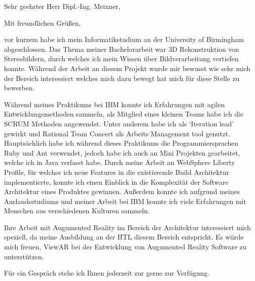 \documentclass[12pt, a4paper,ngerman,sans]{moderncv}        %
\newcommand{\plus}{\raisebox{.4\height}{\scalebox{.6}{+}}}
\begin{document}
\date{\myformat\today}
\subject{Bewerbung als Junior C\plus\plus\hspace{.25em}Entwickler}

\opening{Sehr geehrter Herr Dipl.-Ing. Meixner,}
\closing{Mit freundlichen Grüßen,}
\makelettertitle
vor kurzem habe ich mein Informatikstudium an der University of Birmingham abgeschlossen. Das Thema meiner Bachelorarbeit war 3D Rekonstruktion von Stereobildern, durch welches ich mein Wissen über Bildverarbeitung vertiefen konnte. Während der Arbeit an diesem Projekt wurde mir bewusst wie sehr mich der Bereich interessiert welches mich dazu bewegt hat mich für diese Stelle zu bewerben.

Während meines Praktikums bei IBM konnte ich Erfahrungen mit agilen Entwicklungsmethoden sammeln, als Mitglied eines kleinen Teams habe ich die SCRUM Methoden angewendet. Unter anderem habe ich als `Iteration lead' gewirkt und Rational Team Concert als Arbeits Management tool genutzt. Hauptsächlich habe ich während dieses Praktikums die Programmiersprachen Ruby und Ant verwendet, jedoch habe ich auch an Mini Projekten gearbeitet, welche ich in Java verfasst habe. Durch meine Arbeit an WebSphere Liberty Profile, für welches ich neue Features in die existierende Build Architektur implementierte, konnte ich einen Einblick in die Komplexität der Software Architektur eines Produktes gewinnen. Außerdem konnte ich aufgrund meines Auslandsstudiums und meiner Arbeit bei IBM konnte ich viele Erfahrungen mit Menschen aus verschiedenen Kulturen sammeln. 

Ihre Arbeit mit Augumented Reality im Bereich der Architektur interessiert mich speziell, da meine Ausbildung an der HTL diesem Bereich entspricht. Es würde mich freuen, ViewAR bei der Entwicklung von Augumented Reality Software zu
unterstützen.

Für ein Gespräch stehe ich Ihnen jederzeit zur gerne zur Verfügung.\vspace{1em}

\makeletterclosing

\clearpage                            %
\end{document}
